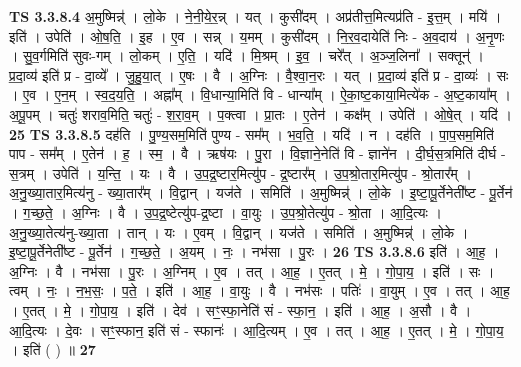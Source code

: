 \documentclass[17pt]{extarticle}
\begin{document}
                  \newline
                                \textbf{ TS 3.3.8.4} \newline
                  अ॒मुष्मिन्न्॑ । लो॒के । ने॒नी॒ये॒र॒न्न् । यत् । कुसी॑दम् । अप्र॑तीत्त॒मित्यप्र॑ति - इ॒त्त॒म् । मयि॑ । इति॑ । उपेति॑ । ओ॒ष॒ति॒ । इ॒ह । ए॒व । सन्न् । य॒मम् । कुसी॑दम् । नि॒र॒व॒दायेति॑ निः - अ॒व॒दाय॑ । अ॒नृ॒णः । सु॒व॒र्गमिति॑ सुवः-गम् । लो॒कम् । ए॒ति॒ । यदि॑ । मि॒श्रम् । इ॒व॒ । चरे᳚त् । अ॒ञ्ज॒लिना᳚ । सक्तून्॑ । प्र॒दा॒व्य॑ इति॑ प्र - दा॒व्ये᳚ । जु॒हु॒या॒त् । ए॒षः । वै । अ॒ग्निः । वै॒श्वा॒न॒रः । यत् । प्र॒दा॒व्य॑ इति॑ प्र - दा॒व्यः॑ । सः । ए॒व । ए॒न॒म् । स्व॒द॒य॒ति॒ । अह्ना᳚म् । वि॒धान्या॒मिति॑ वि - धान्या᳚म् । ऐ॒का॒ष्ट॒काया॒मित्ये॑क - अ॒ष्ट॒काया᳚म् । अ॒पू॒पम् । चतुः॑ शराव॒मिति॒ चतुः॑ - श॒रा॒व॒म् । प॒क्त्वा । प्रा॒तः । ए॒तेन॑ । कक्ष᳚म् । उपेति॑ । ओ॒षे॒त् । यदि॑ । \textbf{  25} \newline
                  \newline
                                \textbf{ TS 3.3.8.5} \newline
                  दह॑ति । पु॒ण्य॒सम॒मिति॑ पुण्य - सम᳚म् । भ॒व॒ति॒ । यदि॑ । न । दह॑ति । पा॒प॒सम॒मिति॑ पाप - सम᳚म् । ए॒तेन॑ । ह॒ । स्म॒ । वै । ऋष॑यः । पु॒रा । वि॒ज्ञाने॒नेति॑ वि - ज्ञाने॑न । दी॒र्घ॒स॒त्रमिति॑ दीर्घ - स॒त्रम् । उपेति॑ । य॒न्ति॒ । यः । वै । उ॒प॒द्र॒ष्टार॒मित्यु॑प - द्र॒ष्टार᳚म् । उ॒प॒श्रो॒तार॒मित्यु॑प - श्रो॒तार᳚म् । अ॒नु॒ख्या॒तार॒मित्य॑नु - ख्या॒तार᳚म् । वि॒द्वान् । यज॑ते । समिति॑ । अ॒मुष्मिन्न्॑ । लो॒के । इ॒ष्टा॒पू॒र्तेनेती᳚ष्ट - पू॒र्तेन॑ । ग॒च्छ॒ते॒ । अ॒ग्निः । वै । उ॒प॒द्र॒ष्टेत्यु॑प-द्र॒ष्टा । वा॒युः । उ॒प॒श्रो॒तेत्यु॑प - श्रो॒ता । आ॒दि॒त्यः । अ॒नु॒ख्या॒तेत्य॑नु-ख्या॒ता । तान् । यः । ए॒वम् । वि॒द्वान् । यज॑ते । समिति॑ । अ॒मुष्मिन्न्॑ । लो॒के । इ॒ष्टा॒पू॒र्तेनेती᳚ष्ट - पू॒र्तेन॑ । ग॒च्छ॒ते॒ । अ॒यम् । नः॒ । नभ॑सा । पु॒रः । \textbf{  26} \newline
                  \newline
                                \textbf{ TS 3.3.8.6} \newline
                  इति॑ । आ॒ह॒ । अ॒ग्निः । वै । नभ॑सा । पु॒रः । अ॒ग्निम् । ए॒व । तत् । आ॒ह॒ । ए॒तत् । मे॒ । गो॒पा॒य॒ । इति॑ । सः । त्वम् । नः॒ । न॒भ॒सः॒ । प॒ते॒ । इति॑ । आ॒ह॒ । वा॒युः । वै । नभ॑सः । पतिः॑ । वा॒युम् । ए॒व । तत् । आ॒ह॒ । ए॒तत् । मे॒ । गो॒पा॒य॒ । इति॑ । देव॑ । सꣳ॒॒स्फा॒नेति॑ सं - स्फा॒न॒ । इति॑ । आ॒ह॒ । अ॒सौ । वै । आ॒दि॒त्यः । दे॒वः । सꣳ॒॒स्फान॒ इति॑ सं - स्फानः॑ । आ॒दि॒त्यम् । ए॒व । तत् । आ॒ह॒ । ए॒तत् । मे॒ । गो॒पा॒य॒ । इति॑ ( ) ॥ \textbf{  27} \newline
                  \newline
\end{document}
